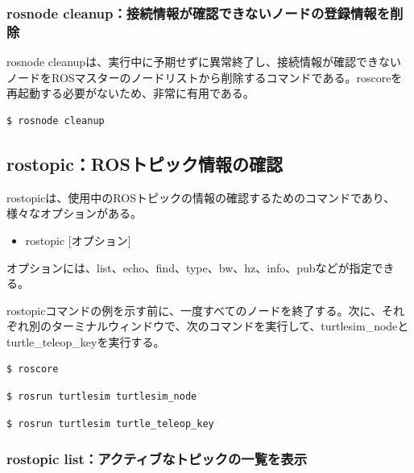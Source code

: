 \subsubsection{rosnode cleanup：接続情報が確認できないノードの登録情報を削除}

rosnode cleanupは、実行中に予期せずに異常終了し、接続情報が確認できないノードをROSマスターのノードリストから削除するコマンドである。roscoreを再起動する必要がないため、非常に有用である。

\begin{lstlisting}[language=ROS]
$ rosnode cleanup
\end{lstlisting}

\subsection{rostopic：ROSトピック情報の確認}

rostopicは、使用中のROSトピックの情報の確認するためのコマンドであり、様々なオプションがある。

\begin{itemize}
\item  rostopic [オプション]
\end{itemize}

オプションには、list、echo、find、type、bw、hz、info、pubなどが指定できる。

rostopicコマンドの例を示す前に、一度すべてのノードを終了する。次に、それぞれ別のターミナルウィンドウで、次のコマンドを実行して、turtlesim\_nodeとturtle\_teleop\_keyを実行する。

\begin{lstlisting}[language=ROS]
$ roscore
\end{lstlisting}

\begin{lstlisting}[language=ROS]
$ rosrun turtlesim turtlesim_node
\end{lstlisting}

\begin{lstlisting}[language=ROS]
$ rosrun turtlesim turtle_teleop_key
\end{lstlisting}

\subsubsection{rostopic list：アクティブなトピックの一覧を表示}


